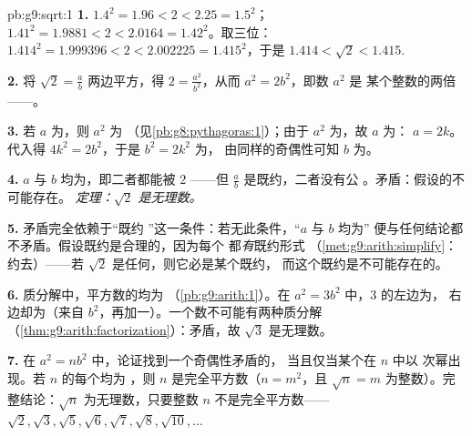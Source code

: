\begin{solution}{pb:g9:sqrt:1}
\textbf{1.} $1.4^2 = 1.96 < 2 < 2.25 = 1.5^2$；
$1.41^2 = 1.9881 < 2 < 2.0164 = 1.42^2$。取三位：
$1.414^2 = 1.999396 < 2 < 2.002225 = 1.415^2$，于是
$1.414 < \sqrt2 < 1.415$.

\textbf{2.} 将 $\sqrt2 = \frac ab$ 两边平方，得
$2 = \frac{a^2}{b^2}$，从而 $a^2 = 2b^2$，即数 $a^2$ 是
某个整数的两倍——\emph{}。

\textbf{3.} 若 $a$ 为，则 $a^2$ 为
（见\cref{pb:g8:pythagoras:1}）；由于 $a^2$ 为，故 $a$ 为：
$a = 2k$。代入得 $4k^2 = 2b^2$，于是 $b^2 = 2k^2$ 为，
由同样的奇偶性可知 $b$ 为。

\textbf{4.} $a$ 与 $b$ 均为，即二者都能被 $2$ 
——但 $\frac ab$ 是既约，二者没有公
。矛盾：假设的不可能存在。
\emph{定理：$\sqrt2$ 是无理数。}

\textbf{5.} 矛盾完全依赖于“既约
”这一条件：若无此条件，“$a$ 与 $b$ 均为”
便与任何结论都不矛盾。假设既约是合理的，因为每个
都\emph{有}既约形式
（\cref{met:g9:arith:simplify}：约去）——若
$\sqrt2$ 是任何，则它必是某个既约，
而这个既约是不可能存在的。

\textbf{6.} 质分解中，平方数的均为
（\cref{pb:g9:arith:1}）。在 $a^2 = 3b^2$ 中，$3$ 的左边为，
右边却为（来自
$b^2$，再加一）。一个数不可能有两种质分解
（\cref{thm:g9:arith:factorization}）：矛盾，故
$\sqrt3$ 是无理数。

\textbf{7.} 在 $a^2 = n b^2$ 中，论证找到一个奇偶性矛盾的，
当且仅当某个在
$n$ 中以 \emph{}次幂出现。若 $n$ 的每个均为
，则 $n$ 是完全平方数（$n = m^2$，且
$\sqrt n = m$ 为整数）。完整结论：$\sqrt n$
为无理数，只要整数 $n$ 不是完全平方数——
$\sqrt2, \sqrt3, \sqrt5, \sqrt6, \sqrt7, \sqrt8, \sqrt{10},
\dots$


\end{solution}
